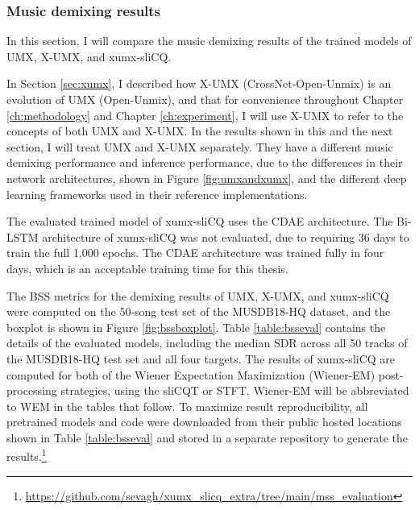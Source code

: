 \documentclass[report.tex]{subfiles}
\begin{document}
\subsubsection{Music demixing results}
\label{sec:demixresults}

In this section, I will compare the music demixing results of the trained models of UMX, X-UMX, and xumx-sliCQ.

In Section \ref{sec:xumx}, I described how X-UMX (CrossNet-Open-Unmix) is an evolution of UMX (Open-Unmix), and that for convenience throughout Chapter \ref{ch:methodology} and Chapter \ref{ch:experiment}, I will use X-UMX to refer to the concepts of both UMX and X-UMX. In the results shown in this and the next section, I will treat UMX and X-UMX separately. They have a different music demixing performance and inference performance, due to the differences in their network architectures, shown in Figure \ref{fig:umxandxumx}, and the different deep learning frameworks used in their reference implementations.

The evaluated trained model of xumx-sliCQ uses the CDAE architecture. The Bi-LSTM architecture of xumx-sliCQ was not evaluated, due to requiring 36 days to train the full 1,000 epochs. The CDAE architecture was trained fully in four days, which is an acceptable training time for this thesis.

The BSS metrics for the demixing results of UMX, X-UMX, and xumx-sliCQ were computed on the 50-song test set of the MUSDB18-HQ dataset, and the boxplot is shown in Figure \ref{fig:bssboxplot}. Table \ref{table:bsseval} contains the details of the evaluated models, including the median SDR across all 50 tracks of the MUSDB18-HQ test set and all four targets. The results of xumx-sliCQ are computed for both of the Wiener Expectation Maximization (Wiener-EM) post-processing strategies, using the sliCQT or STFT. Wiener-EM will be abbreviated to WEM in the tables that follow. To maximize result reproducibility, all pretrained models and code were downloaded from their public hosted locations shown in Table \ref{table:bsseval} and stored in a separate repository to generate the results.\footnote{\url{https://github.com/sevagh/xumx_slicq_extra/tree/main/mss_evaluation}}
\end{document}
